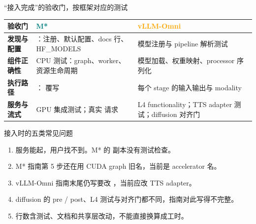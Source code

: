 \begin{frame}[t]{“接入完成”的验收门，按框架对应的测试}
\scriptsize\def\codesize{\relax}
\renewcommand{\arraystretch}{1.16}
\setlength{\tabcolsep}{3pt}
\begin{tabularx}{\textwidth}{>{\bfseries}p{1.6cm} Y Y}
\toprule
{}
验收门 & \textcolor{Teal}{M*} & \textcolor{Orange}{vLLM-Omni} \\
\midrule
发现与配置 & ：注册、默认配置、docs 行、HF\_MODELS & 模型注册与 pipeline 解析测试 \\
组件正确性 &  CPU 测试：graph、worker、资源生命周期 & 模型加载、权重映射、processor 序列化 \\
执行路径 & ： 覆写 & 每个 stage 的输入输出与 modality \\
服务与流式 & GPU 集成测试；真实  请求 & L4 functionality；TTS adapter 测试；diffusion 对齐门 \\
\bottomrule
\end{tabularx}
\vspace{2pt}
\end{frame}

\begin{frame}[t]{接入时的五类常见问题}
\small
\begin{enumerate}
  \item {}服务能起，用户找不到。M* 的  副本没有测试检查。
  \item {}M* 指南第 5 步还在用 CUDA graph 旧名，当前是 accelerator 名。
  \item {}vLLM-Omni 指南末尾仍写要改 ，当前应改 TTS adapter。
  \item {}diffusion 的 pre / post、L4 测试与对齐门都不同，指南对此写得不完整。
  \item {}行数含测试、文档和共享层改动，不能直接换算成工时。
\end{enumerate}
\end{frame}

